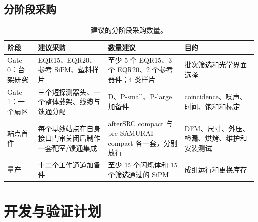 \documentclass[UTF8,10pt,letterpaper,fontset=none]{ctexart}
\begin{document}
\subsection{分阶段采购}

\begin{table}[htbp]
  \centering
  \small
  \caption{建议的分阶段采购数量。}
  \begin{tabularx}{\textwidth}{L{0.17\textwidth}L{0.25\textwidth}L{0.25\textwidth}Y}
    \toprule
    阶段 & 建议采购 & 数量建议 & 目的 \\
    \midrule
    Gate 0：台架研究 & EQR15、EQR20、参考 SiPM、塑料样片 &
      至少 5 个 EQR15、3 个 EQR20、2 个参考器件；4 类样片 &
      批次筛选和光学界面选择 \\
    Gate 1：一个扇区 & 三个短探测器头、一个整体载架、线缆与馈通分配 &
      D、P-small、P-large 加备件 &
      coincidence、噪声、时间、饱和和标定 \\
    站点首件 & 每个基线站点在自身接口门审关闭后制作一套靶室/馈通集成 &
      afterSRC compact 与 pre-SAMURAI compact 各一套，分别放行 &
      DFM、尺寸、外压、检漏、烘烤、维护和安装测试 \\
    量产 & 十二个工作通道加备件 &
      至少 15 个闪烁体和 15 个筛选通过的 SiPM &
      成组运行和更换库存 \\
    \bottomrule
  \end{tabularx}
\end{table}

\section{开发与验证计划}
\end{document}
